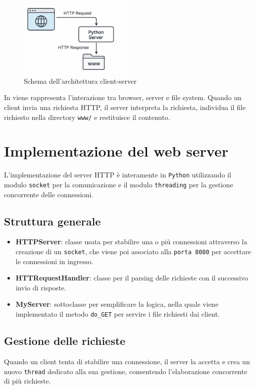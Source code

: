 \documentclass[a4paper,12pt]{report}
\begin{document}
\begin{figure}[H]
    \centering
    \includegraphics[width=0.5\textwidth]{img/architettura.png}
    \caption{Schema dell'architettura client-server}
    \label{fig:architettura}
\end{figure}

In  viene rappresenta l'interazione tra browser, server e file system. Quando un client
invia una richiesta HTTP, il server interpreta la richiesta, individua il file richiesto nella directory \texttt{www/}
e restituisce il contenuto.


\chapter{Implementazione del web server}
L'implementazione del server HTTP è interamente in \texttt{Python} utilizzando il modulo \texttt{socket} per
la comunicazione e il modulo \texttt{threading} per la gestione concorrente delle connessioni.

\section{Struttura generale}
\begin{itemize}
    \item \textbf{HTTPServer}: classe usata per stabilire una o più connessioni \newline attraverso la creazione di
          un \texttt{socket}, che viene poi associato alla \texttt{porta 8080} per accettare le connessioni in ingresso.
    \item \textbf{HTTRequestHandler}: classe per il parsing delle richieste con il successivo invio di risposte.
    \item \textbf{MyServer}: sottoclasse per semplificare la logica, nella quale viene implementato il
          metodo \texttt{do\_GET} per servire i file richiesti dai client.
\end{itemize}


\section{Gestione delle richieste}
Quando un client tenta di stabilire una connessione, il server la accetta e crea un nuovo \texttt{thread} dedicato alla sua gestione,
consentendo l'elaborazione concorrente di più richieste.
\end{document}
